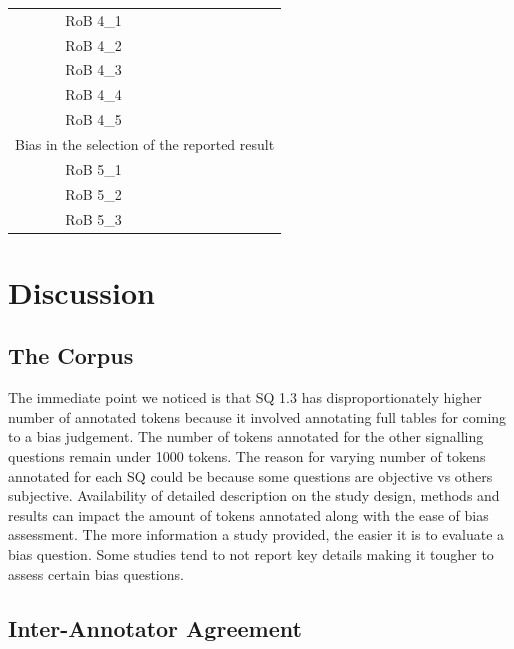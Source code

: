 \documentclass[sn-mathphys,Numbered]{sn-jnl}%
\theoremstyle{thmstyleone}%
\theoremstyle{thmstyletwo}%
\theoremstyle{thmstylethree}%
\begin{document}
\begin{table}[htb]
\begin{tabular}{crrr}
        \hline
        RoB 4\_1 & & & \\ 
        RoB 4\_2 & & & \\ 
        RoB 4\_3 & & & \\ 
        RoB 4\_4 & & & \\ 
        RoB 4\_5 & & & \\ 
        \hline
        \multicolumn{4}{c}{Bias in the selection of the reported result} \\
        \hline
        RoB 5\_1 & & & \\ 
        RoB 5\_2 & & & \\ 
        RoB 5\_3 & & & \\
    \bottomrule[1.0pt]
    \end{tabular}
\end{table}
%
%
%
\section{Discussion}
\label{sec:discussion}
%
%
%
\subsection{The Corpus}
\label{disc:corpus}
%
The immediate point we noticed is that SQ 1.3 has disproportionately higher number of annotated tokens because it involved annotating full tables for coming to a bias judgement.
The number of tokens annotated for the other signalling questions remain under 1000 tokens.
The reason for varying number of tokens annotated for each SQ could be because some questions are objective vs others subjective.
Availability of detailed description on the study design, methods and results can impact the amount of tokens annotated along with the ease of bias assessment.
The more information a study provided, the easier it is to evaluate a bias question.
Some studies tend to not report key details making it tougher to assess certain bias questions.
%
%
%
\subsection{Inter-Annotator Agreement}
\label{disc:iaa}
%
\end{document}
